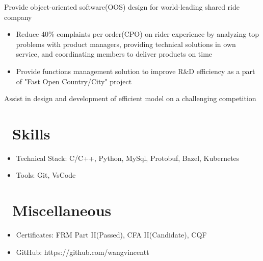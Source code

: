 \documentclass{resume}
\begin{document}
Provide object-oriented software(OOS) design for world-leading shared ride company
\begin{itemize}
  \item Reduce 40\% complaints per order(CPO) on rider experience by analyzing top problems with product managers, providing technical solutions in own service, and coordinating members to deliver products on time
  \item Provide functions management solution to improve R\&D efficiency as a part of "Fast Open Country/City" project
\end{itemize}


Assist in design and development of efficient model on a challenging competition


\section{\faCogs\ Skills}
\begin{itemize}[parsep=0.5ex]
  \item Technical Stack: C/C++, Python, MySql, Protobuf, Bazel, Kubernetes
  \item Tools: Git, VsCode
\end{itemize}

\section{\faInfo\ Miscellaneous}
\begin{itemize}[parsep=0.5ex]
  \item Certificates: FRM Part II(Passed), CFA II(Candidate), CQF
  \item GitHub: https://github.com/wangvincentt
\end{itemize}

%
%
\end{document}
